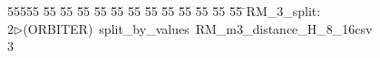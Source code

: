 %
%
\begin{tabbing}
55555 \= 55 \= 55 \= 55 \= 55 \= 55 \= 55 \= 55 \= 55 \= 55 \= 55 \= 55 \= 55 \= \>RM\_3\_split:\\[0pt]
2\>$\triangleright$\>(ORBITER)\ split\_by\_values\ RM\_m3\_distance\_H\_8\_16csv\ \\[0pt]
3\>\end{tabbing}
